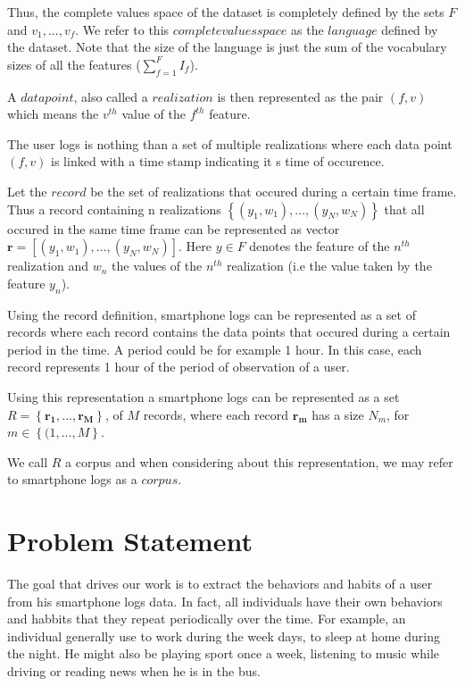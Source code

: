 Thus, the complete values space of the dataset is completely defined by the sets $F$ and $v_1,...,v_f$. We refer to this $complete values space$ as the $language$ defined by the dataset. Note that the size of the language is just the sum of the vocabulary sizes of all the features ($\sum_{f=1}^{F} I_f$).

A $data point$, also called a $realization$ is then represented as the pair $(f,v)$ which means the $v^{th}$ value of the $f^{th}$ feature.

The user logs is nothing than a set of multiple realizations where each data point $(f,v)$ is linked with a time stamp indicating it s time of occurence.

Let the $record$ be the set of realizations that occured during a certain time frame. Thus a record containing n realizations $\left \{ (y_1,w_1),..., (y_N,w_N) \right \}$ that all occured in the same time frame can be represented as vector $\mathbf{r} = [(y_1,w_1),..., (y_N,w_N)]$. Here $y \in F$ denotes the feature of the $n^{th}$ realization and $w_n$ the values of the $n^{th}$ realization (i.e the value taken by the feature $y_n$).

Using the record definition, smartphone logs can be represented as a set of records where each record contains the data points that occured during a certain period in the time. A period could be for example 1 hour. In this case, each record represents 1 hour of the period of observation of a user.

Using this representation a smartphone logs can be represented as a set $R = \left \{ \mathbf{r_1},...,\mathbf{r_M} \right \} $, of $M$ records, where each record $\mathbf{r_m}$ has a size $N_m$, for $m \in \left \{ (1,...,M \right \}$.

We call $R$ a corpus and when considering about this representation, we may refer to smartphone logs as a $corpus$.

\section{Problem Statement}
The goal that drives our work is to extract the behaviors and habits of a user from his smartphone logs data.
In fact, all individuals have their own behaviors and habbits that they repeat periodically over the time. For example, an individual generally use to work during the week days, to sleep at home during the night. He might also be playing sport once a week, listening to music while driving or reading news when he is in the bus.

